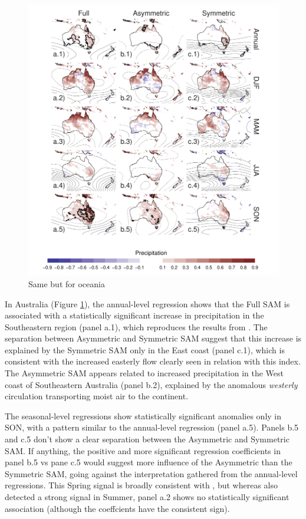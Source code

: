 \documentclass[]{ametsocV5}
\begin{document}
\begin{figure}
\includegraphics{pp-regr-oceania-1} \caption[Same but for oceania]{Same but for oceania}\label{fig:pp-regr-oceania}
\end{figure}

In Australia (Figure \ref{fig:pp-regr-oceania}), the annual-level
regression shows that the Full SAM is associated with a statistically
significant increase in precipitation in the Southeastern region (panel
a.1), which reproduces the results from \citet{gillett2006}. The
separation between Asymmetric and Symmetric SAM suggest that this
increase is explained by the Symmetric SAM only in the East coast (panel
c.1), which is consistent with the increased easterly flow clearly seen
in relation with this index. The Asymmetric SAM appears related to
increased precipitation in the West coast of Southeastern Australia
(panel b.2), explained by the anomalous \emph{westerly} circulation
transporting moist air to the continent.

The seasonal-level regressions show statistically significant anomalies
only in SON, with a pattern similar to the annual-level regression
(panel a.5). Panels b.5 and c.5 don't show a clear separation between
the Asymmetric and Symmetric SAM. If anything, the positive and more
significant regression coefficients in panel b.5 vs pane c.5 would
suggest more influence of the Asymmetric than the Symmetric SAM, going
against the interpretation gathered from the annual-level regressions.
This Spring signal is broadly consistent with \citet{hendon2007}, but
whereas \citet{hendon2007} also detected a strong signal in Summer,
panel a.2 shows no statistically significant association (although the
coeffcients have the consistent sign).
\end{document}
